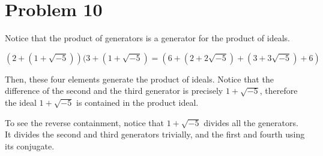 \documentclass{article}
\theoremstyle{definition}
\begin{document}
\section{Problem 10}

Notice that the product of generators is a generator for the product of ideals.

\[ (2 + (1 + \sqrt{-5}))(3 + ( 1 + \sqrt{-5}) = (6 + (2 + 2\sqrt{-5}) + (3 + 3\sqrt{-5}) + 6)\]

Then, these four elements generate the product of ideals. Notice that the difference of the second and the third generator is precisely $1 + \sqrt{-5}$, therefore the ideal $1 + \sqrt{-5}$ is contained in the product ideal.

To see the reverse containment, notice that $1 + \sqrt{-5}$ divides all the generators. It divides the second and third generators trivially, and the first and fourth using its conjugate.
\end{document}
